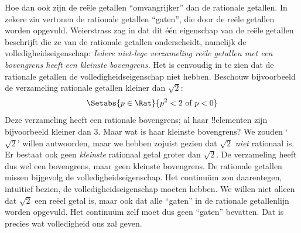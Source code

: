 \documentclass[../../../include/open-logic-section]{subfiles}
\begin{document}
Hoe dan ook zijn de reële getallen ``omvangrijker'' dan de rationale
getallen. In zekere zin vertonen de rationale getallen ``gaten'', die
door de reële getallen worden opgevuld. Weierstrass zag in dat dit één
eigenschap van de reële getallen beschrijft die ze van de rationale
getallen onderscheidt, namelijk de volledigheidseigenschap:
\emph{Iedere niet-lege verzameling reële getallen met een bovengrens
heeft een kleinste bovengrens.}
Het is eenvoudig in te zien dat de rationale getallen de
volledigheidseigenschap niet hebben. Beschouw bijvoorbeeld de
verzameling rationale getallen kleiner dan $\sqrt{2}$:
\[
	\Setabs{p \in \Rat}{p^2 < 2 \text{ of }p < 0}
\]
Deze verzameling heeft een rationale bovengrens; al haar !!{element}en
zijn bijvoorbeeld kleiner dan $3$. Maar wat is haar kleinste
bovengrens? We zouden `$\sqrt{2}$' willen antwoorden, maar we hebben
zojuist gezien dat $\sqrt{2}$ \emph{niet} rationaal is. Er bestaat ook
geen \emph{kleinste} rationaal getal groter dan $\sqrt{2}$. De
verzameling heeft dus wel een bovengrens, maar geen kleinste
bovengrens. De rationale getallen missen bijgevolg de
volledigheidseigenschap.
Het continuüm zou daarentegen, intuïtief bezien, de
volledigheidseigenschap moeten hebben. We willen niet alleen dat
$\sqrt{2}$ een reëel getal is, maar ook dat alle ``gaten'' in de
rationale getallenlijn worden opgevuld. Het continuüm zelf moet dus
geen ``gaten'' bevatten. Dat is precies wat volledigheid ons zal geven.
\end{document}
